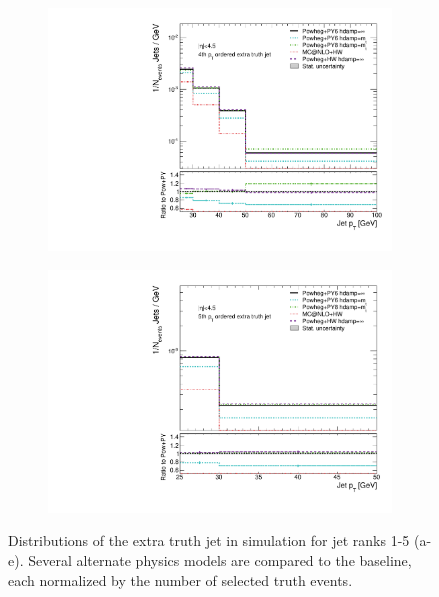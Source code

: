 \begin{figure}
\begin{subfigure}[]{0.33\textwidth}
\end{subfigure}
\begin{subfigure}[]{0.33\textwidth}
\includegraphics[width=\textwidth]{fig/MCComp/NLO/TruthPtJet3.pdf}
\end{subfigure}
\begin{subfigure}[]{0.33\textwidth}
\includegraphics[width=\textwidth]{fig/MCComp/NLO/TruthPtJet4.pdf}
\end{subfigure}
\caption{Distributions of the extra truth jet \pt in \ttbar simulation for jet ranks 1-5 (a-e). Several alternate physics models are compared to the baseline, each normalized by the number of selected truth events.}
\label{fig:truthjetpt}
\end{figure}
